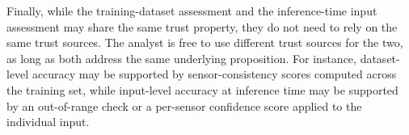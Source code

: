 Finally, while the training-dataset assessment and the inference-time input assessment may share the same trust property, they do not need to rely on the same trust sources. The analyst is free to use different trust sources for the two, as long as both address the same underlying proposition. For instance, dataset-level accuracy may be supported by sensor-consistency scores computed across the training set, while input-level accuracy at inference time may be supported by an out-of-range check or a per-sensor confidence score applied to the individual input.
